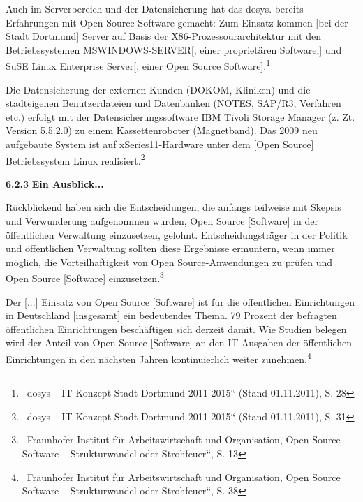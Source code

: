 \documentclass[a4paper]{article}
\begin{document}
{
Auch im Serverbereich und der Datensicherung hat das dosys. bereits
Erfahrungen mit Open Source Software gemacht: {\guillemotright}Zum
Einsatz kommen [bei der Stadt Dortmund] Server auf Basis der
X86-Prozessourarchitektur mit den Betriebssystemen MSWINDOWS-SERVER[,
einer propriet\"aren Software,] und SuSE Linux Enterprise Server[,
einer Open Source Software].{\guillemotleft}\footnote{\ dosys --
{\quotedblbase}IT-Konzept Stadt Dortmund 2011-2015{\textquotedblleft}
(Stand 01.11.2011), S. 28}}

{
{\guillemotright}Die Datensicherung der externen Kunden (DOKOM,
Kliniken) und die stadteigenen Benutzerdateien und Datenbanken (NOTES,
SAP/R3, Verfahren etc.) erfolgt mit der Datensicherungssoftware IBM
Tivoli Storage Manager (z. Zt. Version 5.5.2.0) zu einem
Kassettenroboter (Magnetband). Das 2009 neu aufgebaute System ist auf
xSeries11-Hardware unter dem [Open Source] Betriebssystem Linux
realisiert.{\guillemotleft}\footnote{\ dosys --
{\quotedblbase}IT-Konzept Stadt Dortmund 2011-2015{\textquotedblleft}
(Stand 01.11.2011), S. 31}}


\bigskip


\bigskip

{
\hypertarget{EinAusblick}{}\textbf{6.2.3}\textbf{ Ein Ausblick...}}


\bigskip

{
{\guillemotright}R\"uckblickend haben sich die Entscheidungen, die
anfangs teilweise mit Skepsis und Verwunderung aufgenommen wurden, Open
Source [Software] in der \"offentlichen Verwaltung einzusetzen,
gelohnt. Entscheidungstr\"ager in der Politik und \"offentlichen
Verwaltung sollten diese Ergebnisse ermuntern, wenn immer m\"oglich,
die Vorteilhaftigkeit von Open Source-Anwendungen zu pr\"ufen und Open
Source [Software] einzusetzen.{\guillemotleft}\footnote{\ Fraunhofer
Institut f\"ur Arbeitswirtschaft und Organisation, {\quotedblbase}Open
Source Software -- Strukturwandel oder Strohfeuer{\textquotedblleft},
S. 13}}


\bigskip

{
Der {\guillemotright} [...] Einsatz von Open Source [Software] ist f\"ur
die \"offentlichen Einrichtungen in Deutschland [insgesamt] ein
bedeutendes Thema. 79 Prozent der befragten \"offentlichen
Einrichtungen besch\"aftigen sich derzeit damit. Wie Studien belegen
wird der Anteil von Open Source [Software] an den IT-Ausgaben der
\"offentlichen Einrichtungen in den n\"achsten Jahren kontinuierlich
weiter zunehmen.{\guillemotleft}\footnote{\ Fraunhofer Institut f\"ur
Arbeitswirtschaft und Organisation, {\quotedblbase}Open Source Software
-- Strukturwandel oder Strohfeuer{\textquotedblleft}, S. 38}}
\end{document}
